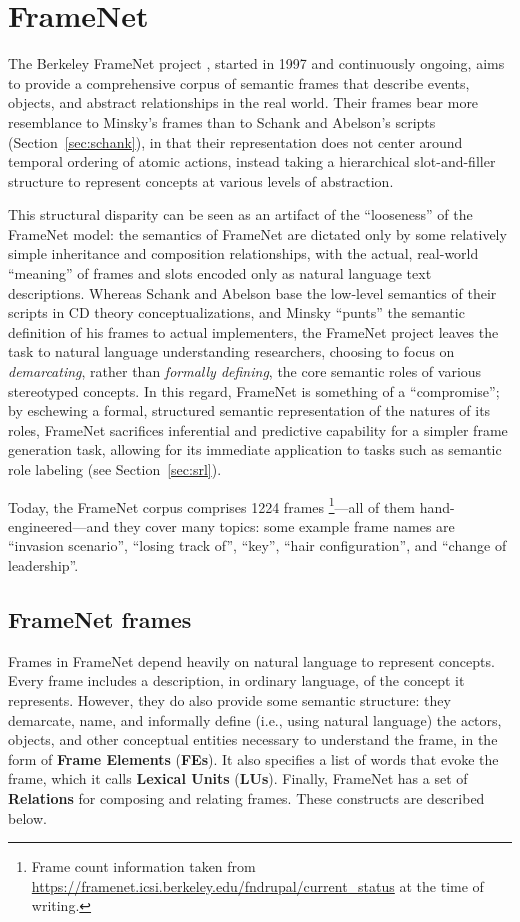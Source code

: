 \section{FrameNet}
\label{sec:framenet}

The Berkeley FrameNet project \citep{framenet}, started in 1997 and continuously ongoing, aims to provide a comprehensive corpus of semantic frames that describe events, objects, and abstract relationships in the real world.
Their frames bear more resemblance to Minsky's frames
than to Schank and Abelson's scripts (Section~\ref{sec:schank}), in that their representation does not center around temporal ordering of atomic actions, instead taking a hierarchical slot-and-filler structure to represent concepts at various levels of abstraction.

This structural disparity can be seen as an artifact of the ``looseness'' of the FrameNet model: the semantics of FrameNet are dictated only by some relatively simple inheritance and composition relationships, with the actual, real-world ``meaning'' of frames and slots encoded only as natural language text descriptions. Whereas Schank and Abelson base the low-level semantics of their scripts in CD theory conceptualizations, and Minsky ``punts'' the semantic definition of his frames to actual implementers, the FrameNet project leaves the task to natural language understanding researchers, choosing to focus on \textit{demarcating}, rather than \textit{formally defining}, the core semantic roles of various stereotyped concepts. In this regard, FrameNet is something of a ``compromise''; by eschewing a formal, structured semantic representation of the natures of its roles, FrameNet sacrifices inferential and predictive capability for a simpler frame generation task, allowing for its immediate application to tasks such as semantic role labeling (see Section~\ref{sec:srl}).

Today, the FrameNet corpus comprises 1224 frames \footnote{Frame count information taken from \url{https://framenet.icsi.berkeley.edu/fndrupal/current_status} at the time of writing.}---all of them hand-engineered---and they cover many topics: some example frame names are ``invasion scenario'', ``losing track of'', ``key'', ``hair configuration'', and ``change of leadership''.

\subsection{FrameNet frames}
Frames in FrameNet depend heavily on natural language to represent concepts. Every frame includes a description, in ordinary language, of the concept it represents. However, they do also provide some semantic structure: they demarcate, name, and informally define (i.e., using natural language) the actors, objects, and other conceptual entities necessary to understand the frame, in the form of \textbf{Frame Elements} (\textbf{FEs}). It also specifies a list of words that evoke the frame, which it calls \textbf{Lexical Units} (\textbf{LUs}). Finally, FrameNet has a set of \textbf{Relations} for composing and relating frames. These constructs are described below.

